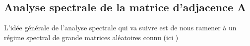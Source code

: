 \subsection{Analyse spectrale de la matrice d'adjacence \textbf{A}}
L'idée générale de l'analyse spectrale qui va suivre est de nous ramener à un régime spectral de grande matrices aléatoires connu (ici )
